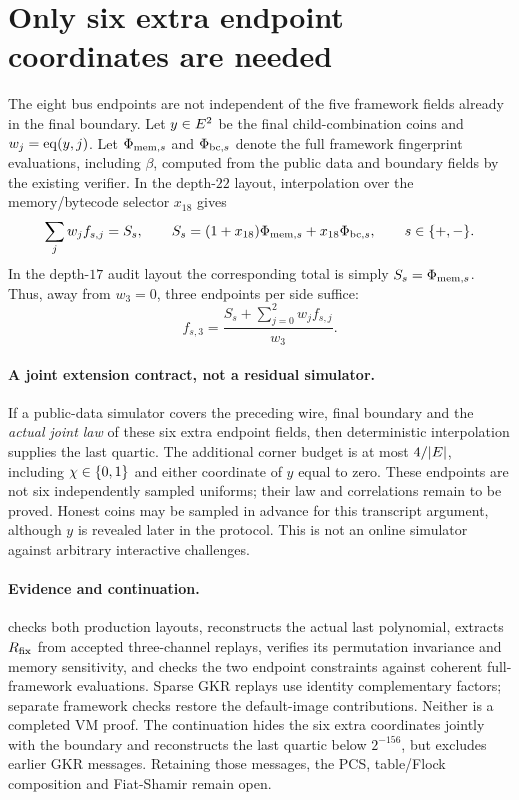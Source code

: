 \documentclass[11pt]{article}
\begin{document}
\section{Only six extra endpoint coordinates are needed}

The eight bus endpoints are not independent of the five framework fields already in the final boundary. Let $y\in E^2$ be the final child-combination coins and $w_j=\operatorname{eq}(y,j)$. Let $\Phi_{{\rm mem},s}$ and $\Phi_{{\rm bc},s}$ denote the full framework fingerprint evaluations, including $\beta$, computed from the public data and boundary fields by the existing verifier. In the depth-$22$ layout, interpolation over the memory/bytecode selector $x_{18}$ gives
\[
 \sum_j w_j f_{s,j}=S_s,
 \qquad S_s=(1+x_{18})\Phi_{{\rm mem},s}+x_{18}\Phi_{{\rm bc},s},
 \qquad s\in\{+,-\}.
\]
In the depth-$17$ audit layout the corresponding total is simply $S_s=\Phi_{{\rm mem},s}$. Thus, away from $w_3=0$, three endpoints per side suffice:
\[
 f_{s,3}=\frac{S_s+\sum_{j=0}^2w_jf_{s,j}}{w_3}.
\]

\paragraph{A joint extension contract, not a residual simulator.} If a public-data simulator covers the preceding wire, final boundary and the \emph{actual joint law} of these six extra endpoint fields, then deterministic interpolation supplies the last quartic. The additional corner budget is at most $4/|E|$, including $\chi\in\{0,1\}$ and either coordinate of $y$ equal to zero. These endpoints are not six independently sampled uniforms; their law and correlations remain to be proved. Honest coins may be sampled in advance for this transcript argument, although $y$ is revealed later in the protocol. This is not an online simulator against arbitrary interactive challenges.

\paragraph{Evidence and continuation.}  checks both production layouts, reconstructs the actual last polynomial, extracts $R_{\rm fix}$ from accepted three-channel replays, verifies its permutation invariance and memory sensitivity, and checks the two endpoint constraints against coherent full-framework evaluations. Sparse GKR replays use identity complementary factors; separate framework checks restore the default-image contributions. Neither is a completed VM proof. The continuation  hides the six extra coordinates jointly with the boundary and reconstructs the last quartic below $2^{-156}$, but excludes earlier GKR messages. Retaining those messages, the PCS, table/Flock composition and Fiat-Shamir remain open.
\end{document}
